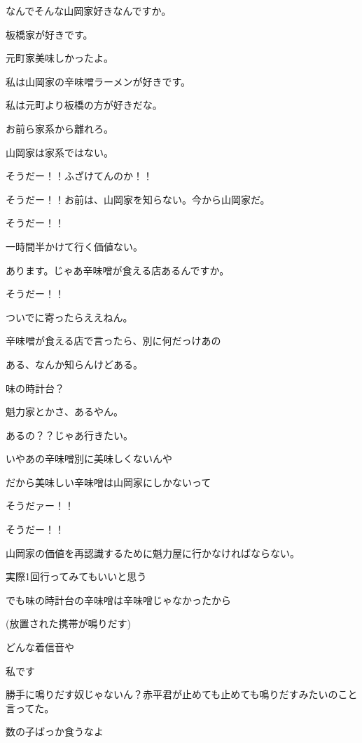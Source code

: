 \begin{multicols}{3}
なんでそんな山岡家好きなんですか。

板橋家が好きです。

元町家美味しかったよ。

私は山岡家の辛味噌ラーメンが好きです。

私は元町より板橋の方が好きだな。

お前ら家系から離れろ。

山岡家は家系ではない。

そうだー！！ふざけてんのか！！

そうだー！！お前は、山岡家を知らない。今から山岡家だ。

そうだー！！

一時間半かけて行く価値ない。

あります。じゃあ辛味噌が食える店あるんですか。

そうだー！！

ついでに寄ったらええねん。

辛味噌が食える店で言ったら、別に何だっけあの

ある、なんか知らんけどある。

味の時計台？

魁力家とかさ、あるやん。

あるの？？じゃあ行きたい。

いやあの辛味噌別に美味しくないんや

だから美味しい辛味噌は山岡家にしかないって

そうだァー！！

そうだー！！

山岡家の価値を再認識するために魁力屋に行かなければならない。

実際1回行ってみてもいいと思う

でも味の時計台の辛味噌は辛味噌じゃなかったから

(放置された携帯が鳴りだす)

どんな着信音や

私です

勝手に鳴りだす奴じゃないん？赤平君が止めても止めても鳴りだすみたいのこと言ってた。

数の子ばっか食うなよ


\end{multicols}
